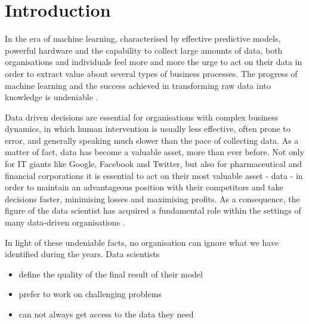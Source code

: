 \documentclass[12pt, a4paper,titlepage]{extreport}
\begin{document}
\section{Introduction}


In the era of machine learning, characterised by effective predictive models, powerful hardware and the capability to collect large amounts of data, both organisations and individuals feel more and more the urge to act on their data in order to extract value about several types of business processes. The progress of machine learning and the success achieved in transforming raw data into knowledge is undeniable \cite{successml}. 


Data driven decisions are essential for organisations with complex business dynamics, in which human intervention is usually less effective, often prone to error, and generally speaking much slower than the pace of collecting data. As a matter of fact, data has become a valuable asset, more than ever before. Not only for IT giants like Google, Facebook and Twitter, but also for pharmaceutical and financial corporations it is essential to act on their most valuable asset - data - in order to maintain an advantageous position with their competitors and take decisions faster, minimising losses and maximising profits. As a consequence, the figure of the data scientist has acquired a fundamental role within the settings of many data-driven organisations \cite{forbesds}.

In light of these undeniable facts, no organisation can ignore what we have identified during the years. Data scientists

\begin{itemize}
\item define the quality of the final result of their model
\item prefer to work on challenging problems
\item can not always get access to the data they need
\end{itemize}
\end{document}
